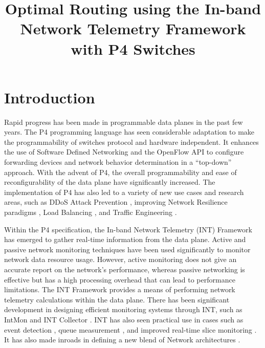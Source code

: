 \documentclass[conference]{IEEEtran}
\begin{document}
\title{Optimal Routing using the In-band Network Telemetry Framework with P4 Switches\\}

\author{
\and
{}
}
\maketitle

\section{Introduction}
Rapid progress has been made in programmable data planes in the past few years. The P4 programming language \cite{b1} has seen considerable adaptation to make the programmability of switches protocol and hardware independent. It enhances the use of Software Defined Networking and the OpenFlow API to configure forwarding devices and network behavior determination in a “top-down” approach.  With the advent of P4, the overall programmability and ease of reconfigurability of the data plane have significantly increased. The implementation of P4 has also led to a variety of new use cases and research areas, such as DDoS Attack Prevention \cite{b2}, improving Network Resilience paradigms \cite{b3}, Load Balancing \cite{b4}, and Traffic Engineering \cite{b5}.

Within the P4 specification, the In-band Network Telemetry (INT) Framework has emerged to gather real-time information from the data plane. Active and passive network monitoring techniques have been used significantly to monitor network data resource usage. However, active monitoring does not give an accurate report on the network’s performance, whereas passive networking is effective but has a high processing overhead that can lead to performance limitations. The INT Framework provides a means of performing network telemetry calculations within the data plane. There has been significant development in designing efficient monitoring systems through INT, such as IntMon \cite{b6} and INT Collector \cite{b7}.  INT has also seen practical use in cases such as event detection \cite{b8}, queue measurement \cite{b9}, and improved real-time slice monitoring \cite{b10}. It has also made inroads in defining a new blend of Network architectures \cite{b11}.
\end{document}

